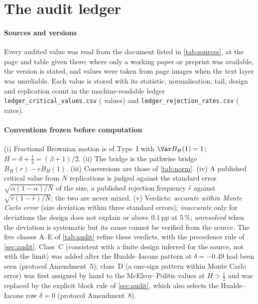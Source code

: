 \section{The audit ledger}\label{app:audit}

\paragraph{Sources and versions} Every audited value was read from the document listed in \cref{tab:sources}, at the
page and table given there; where only a working paper or preprint was available, the version is stated, and values were
taken from page images when the text layer was unreliable. Each value is stored with its statistic, normalisation, tail,
design and replication count in the machine-readable ledger \texttt{ledger\_critical\_values.csv}
( values) and \texttt{ledger\_rejection\_rates.csv} ( rates).

\begin{table}[h]\centering\small
\caption{Documents, versions and table locations for the published values in the audit.}\label{tab:sources}
%
\end{table}

\paragraph{Conventions frozen before computation} (i) Fractional Brownian motion is of Type~I with $\Var B_H(1)=1$;
$H=\delta+\frac12=(\beta+1)/2$. (ii) The bridge is the pathwise bridge $B_H(r)-rB_H(1)$. (iii) Conversions are those of
\cref{tab:norm}. (iv) A published critical value from $N$ replications is judged against the standard error
$\sqrt{\alpha(1-\alpha)/N}$ of the size, a published rejection frequency $\hat r$ against $\sqrt{\hat r(1-\hat r)/N}$;
the two are never mixed. (v) Verdicts: \emph{accurate within Monte Carlo error} (size deviation within three standard
errors); \emph{inaccurate} only for deviations the design does not explain or above $0.1$\,pp at $5\,\%$;
\emph{unresolved} when the deviation is systematic but its cause cannot be verified from the source. The five classes
A--E of \cref{tab:audit} refine these verdicts, with the precedence rule of \cref{sec:audit}. Class~C (consistent with a
finite design inferred for the source, not with the limit) was added after the Hualde--Iacone pattern at $\delta=-0.49$
had been seen (protocol Amendment~5); class~D (a one-sign pattern within Monte Carlo error) was first assigned by hand
to the McElroy--Politis values at $H>\frac12$ and was replaced by the explicit block rule of \cref{sec:audit}, which
also selects the Hualde--Iacone row $\delta=0$ (protocol Amendment~8).

